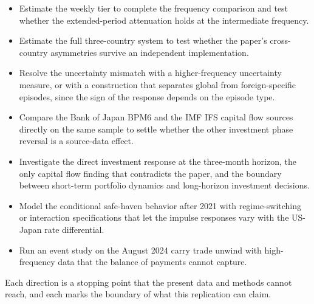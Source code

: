 \begin{itemize}
  \item Estimate the weekly tier to complete the frequency comparison and test whether the extended-period attenuation holds at the intermediate frequency.
  \item Estimate the full three-country system to test whether the paper's cross-country asymmetries survive an independent implementation.
  \item Resolve the uncertainty mismatch with a higher-frequency uncertainty measure, or with a construction that separates global from foreign-specific episodes, since the sign of the response depends on the episode type.
  \item Compare the Bank of Japan BPM6 and the IMF IFS capital flow sources directly on the same sample to settle whether the other investment phase reversal is a source-data effect.
  \item Investigate the direct investment response at the three-month horizon, the only capital flow finding that contradicts the paper, and the boundary between short-term portfolio dynamics and long-horizon investment decisions.
  \item Model the conditional safe-haven behavior after 2021 with regime-switching or interaction specifications that let the impulse responses vary with the US-Japan rate differential.
  \item Run an event study on the August 2024 carry trade unwind with high-frequency data that the balance of payments cannot capture.
\end{itemize}

Each direction is a stopping point that the present data and methods cannot reach, and each marks the boundary of what this replication can claim.

